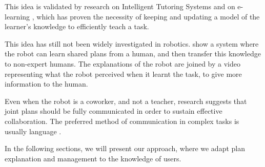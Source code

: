 This idea is validated by research on Intelligent Tutoring Systems \cite{brusilovskiy1994construction}  and on e-learning \cite{brusilovskiy2005}, which has proven  the necessity of keeping and updating a model of the learner's knowledge to efficiently teach a task.

This idea has still not been widely investigated in robotics. \cite{Sorce2015} show a system where the robot can learn shared plans from a human, and then transfer this knowledge to non-expert humans. The explanations of the robot are joined by a video representing what the robot perceived when it learnt the task, to give more information to the human.

Even when the robot is a coworker, and not a teacher, research \citep{Lallee2013} suggests that joint plans should be fully communicated in order to sustain effective collaboration. The preferred method of communication in complex tasks is usually language \citep{Warneken2006,Warneken2007}.

In the following sections, we will present our approach, where we adapt plan explanation and management to the knowledge of users.







